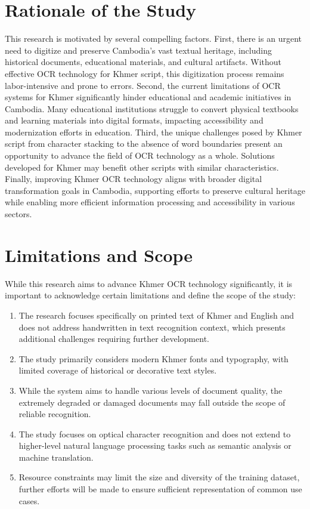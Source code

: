 \section{Rationale of the Study}
\label{sec:rationale}
       This research is motivated by several compelling factors. First, there is an urgent need to digitize and preserve Cambodia's vast textual heritage, including historical documents, educational materials, and cultural artifacts. Without effective OCR technology for Khmer script, this digitization process remains labor-intensive and prone to errors.
       Second, the current limitations of OCR systems for Khmer significantly hinder educational and academic initiatives in Cambodia. Many educational institutions struggle to convert physical textbooks and learning materials into digital formats, impacting accessibility and modernization efforts in education.
       Third, the unique challenges posed by Khmer script from character stacking to the absence of word boundaries present an opportunity to advance the field of OCR technology as a whole. Solutions developed for Khmer may benefit other scripts with similar characteristics.
       Finally, improving Khmer OCR technology aligns with broader digital transformation goals in Cambodia, supporting efforts to preserve cultural heritage while enabling more efficient information processing and accessibility in various sectors.

\section{Limitations and Scope}
\label{sec:limitations}

While this research aims to advance Khmer OCR technology significantly, it is important to acknowledge certain limitations and define the scope of the study:

\begin{enumerate}
    \item The research focuses specifically on printed text of Khmer and English and does not address handwritten in text recognition context, which presents additional challenges requiring further development.
    
    \item The study primarily considers modern Khmer fonts and typography, with limited coverage of historical or decorative text styles.
    
    \item While the system aims to handle various levels of document quality, the extremely degraded or damaged documents may fall outside the scope of reliable recognition.
    
    \item The study focuses on optical character recognition and does not extend to higher-level natural language processing tasks such as semantic analysis or machine translation.
    
    \item Resource constraints may limit the size and diversity of the training dataset, further efforts will be made to ensure sufficient representation of common use cases.
\end{enumerate}


